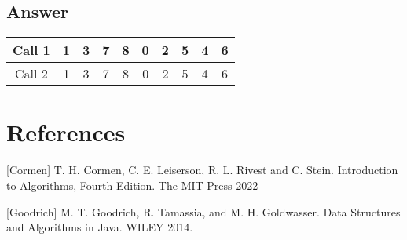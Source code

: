 \documentclass{article}
\begin{document}
\subsection{Answer}

\begin{table}[!h]
    \centering
    \begin{tabular}{|c||c|c|c|c|c|c|c|c|c|}
        \hline
        Call 1 & 1 & 3 & 7 & 8 & 0 & 2 & 5 & 4 & 6 \\
        \hline
        Call 2 & 1 & 3 & 7 & 8 & 0 & 2 & 5 & 4 & 6 \\
        \hline
    \end{tabular}
\end{table}


\section*{References}
[Cormen] T. H. Cormen, C. E. Leiserson, R. L. Rivest and C. Stein. Introduction to Algorithms, Fourth Edition. The MIT Press 2022

[Goodrich] M. T. Goodrich, R. Tamassia, and M. H. Goldwasser. Data Structures and Algorithms in Java. WILEY 2014.
\end{document}
